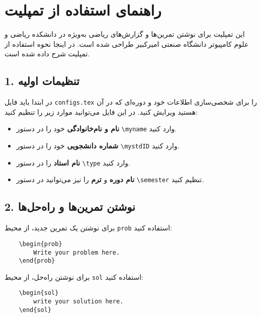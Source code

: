 

\section*{راهنمای استفاده از تمپلیت}

این تمپلیت برای نوشتن تمرین‌ها و گزارش‌های ریاضی به‌ویژه در دانشکده ریاضی و علوم کامپیوتر دانشگاه صنعتی امیرکبیر طراحی شده است. در اینجا نحوه استفاده از تمپلیت شرح داده شده است.

\subsection*{1. تنظیمات اولیه}

در ابتدا باید فایل \texttt{configs.tex} را برای شخصی‌سازی اطلاعات خود و دوره‌ای که در آن هستید ویرایش کنید. در این فایل می‌توانید موارد زیر را تنظیم کنید:
\begin{itemize}
    \item \textbf{نام و نام‌خانوادگی} خود را در دستور \texttt{\textbackslash myname} وارد کنید.
    \item \textbf{شماره دانشجویی} خود را در دستور \texttt{\textbackslash mystdID} وارد کنید.
    \item \textbf{نام استاد} را در دستور \texttt{\textbackslash type} وارد کنید.
    \item \textbf{نام دوره} و \textbf{ترم} را نیز می‌توانید در دستور \texttt{\textbackslash semester} تنظیم کنید.
\end{itemize}

\subsection*{2. نوشتن تمرین‌ها و راه‌حل‌ها}

برای نوشتن یک تمرین جدید، از محیط \texttt{prob} استفاده کنید:
\begin{LTR}
    \begin{verbatim}
    \begin{prob}
        Write your problem here.
    \end{prob}
    \end{verbatim}
\end{LTR}

برای نوشتن راه‌حل، از محیط \texttt{sol} استفاده کنید:

\begin{LTR}
    \begin{verbatim}
    \begin{sol}
        write your solution here.
    \end{sol}
    \end{verbatim}
\end{LTR}

